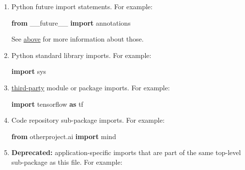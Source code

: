 \documentclass[
]{article}
\newenvironment{Shaded}{}{}
\newcommand{\ImportTok}[1]{\textcolor[rgb]{0.00,0.50,0.00}{\textbf{#1}}}
\newcommand{\NormalTok}[1]{#1}
\begin{document}
\begin{enumerate}
\def\labelenumi{\arabic{enumi}.}
\item
  Python future import statements. For example:

\begin{samepage}
  \begin{Shaded}
\begin{Highlighting}[]
\ImportTok{from}\NormalTok{ \_\_future\_\_ }\ImportTok{import}\NormalTok{ annotations}
\end{Highlighting}
\end{Shaded}
\end{samepage}

  See \hyperref[from-future-imports]{above} for more information about
  those.
\item
  Python standard library imports. For example:

\begin{samepage}
  \begin{Shaded}
\begin{Highlighting}[]
\ImportTok{import}\NormalTok{ sys}
\end{Highlighting}
\end{Shaded}
\end{samepage}
\item
  \href{https://pypi.org/}{third-party} module or package imports. For
  example:

\begin{samepage}
  \begin{Shaded}
\begin{Highlighting}[]
\ImportTok{import}\NormalTok{ tensorflow }\ImportTok{as}\NormalTok{ tf}
\end{Highlighting}
\end{Shaded}
\end{samepage}
\item
  Code repository sub-package imports. For example:

\begin{samepage}
  \begin{Shaded}
\begin{Highlighting}[]
\ImportTok{from}\NormalTok{ otherproject.ai }\ImportTok{import}\NormalTok{ mind}
\end{Highlighting}
\end{Shaded}
\end{samepage}
\item
  \textbf{Deprecated:} application-specific imports that are part of the
  same top-level sub-package as this file. For example:


\end{enumerate}
\end{document}
